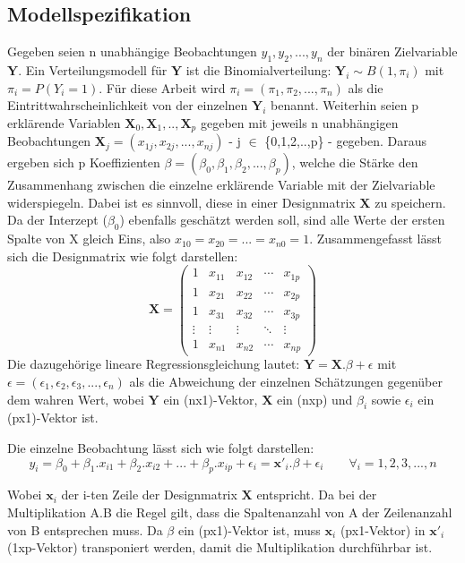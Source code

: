 \documentclass[12pt,]{article}
\begin{document}
\subsection{Modellspezifikation}\label{modellspezifikation}

Gegeben seien n unabhängige Beobachtungen \(y_1, y_2, ...,y_n\) der
binären Zielvariable \(\mathbf{Y}\). Ein Verteilungsmodell für
\(\mathbf{Y}\) ist die Binomialverteilung:
\(\mathbf{Y}_i \sim B(1, \pi_i)\) mit \(\pi_i = P(Y_i = 1)\). Für diese
Arbeit wird \(\pi_i = (\pi_1, \pi_2, ..., \pi_n)\) als die
Eintrittwahrscheinlichkeit von der einzelnen \(\mathbf{Y}_i\) benannt.
Weiterhin seien p erklärende Variablen
\(\mathbf{X}_0,\mathbf{X}_1,..,\mathbf{X}_p\) gegeben mit jeweils n
unabhängigen Beobachtungen
\(\mathbf{X}_j = (x_{1j}, x_{2j},..., x_{nj})\) - j \(\in\)
\{0,1,2,..,p\} - gegeben. Daraus ergeben sich p Koeffizienten
\(\beta = (\beta_0, \beta_1, \beta_2,..., \beta_p)\), welche die Stärke
den Zusammenhang zwischen die einzelne erklärende Variable mit der
Zielvariable widerspiegeln. Dabei ist es sinnvoll, diese in einer
Designmatrix \(\mathbf{X}\) zu speichern. Da der Interzept (\(\beta_0\))
ebenfalls geschätzt werden soll, sind alle Werte der ersten Spalte von X
gleich Eins, also \(x_{10} = x_{20} = ... = x_{n0} = 1\).
Zusammengefasst lässt sich die Designmatrix wie folgt darstellen: \[
\mathbf{X} =
 \begin{pmatrix}
    1 & x_{11} & x_{12} & \cdots & x_{1p} \\
    1 & x_{21} & x_{22} & \cdots & x_{2p} \\
    1 & x_{31} & x_{32} & \cdots & x_{3p} \\
    \vdots  & \vdots  & \vdots & \ddots & \vdots \\
    1 & x_{n1} & x_{n2} & \cdots & x_{np}
 \end{pmatrix}
\] Die dazugehörige lineare Regressionsgleichung lautet:
\(\mathbf{Y} = \mathbf{X}.\beta + \epsilon\) mit
\(\epsilon = (\epsilon_1, \epsilon_2, \epsilon_3, ..., \epsilon_n)\) als
die Abweichung der einzelnen Schätzungen gegenüber dem wahren Wert,
wobei \(\mathbf{Y}\) ein (nx1)-Vektor, \(\mathbf{X}\) ein (nxp) und
\(\beta_i\) sowie \(\epsilon_i\) ein (px1)-Vektor ist.

Die einzelne Beobachtung lässt sich wie folgt darstellen: \[
y_i = \beta_0 + \beta_1.x_{i1} + \beta_2.x_{i2} + ... + \beta_p.x_{ip} + \epsilon_i = \mathbf{x'}_i.\beta + \epsilon_i \qquad \forall_i = 1,2,3,...,n
\]

Wobei \(\mathbf{x}_i\) der i-ten Zeile der Designmatrix \(\mathbf{X}\)
entspricht. Da bei der Multiplikation A.B die Regel gilt, dass die
Spaltenanzahl von A der Zeilenanzahl von B entsprechen muss. Da
\(\beta\) ein (px1)-Vektor ist, muss \(\mathbf{x}_i\) (px1-Vektor) in
\(\mathbf{x'}_i\) (1xp-Vektor) transponiert werden, damit die
Multiplikation durchführbar ist.
\end{document}
